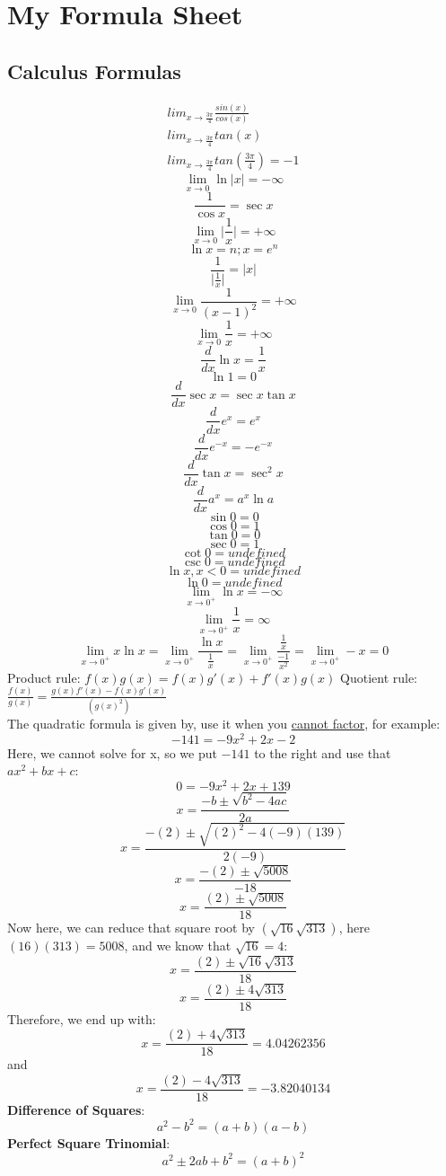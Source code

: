 \documentclass{article}
\begin{document}
\section*{My Formula Sheet}

\subsection*{Calculus Formulas}
\begin{align}
   lim_{x \to \frac{3\pi}{4}} \frac{sin(x)}{cos(x)}\\
   lim_{x \to \frac{3\pi}{4}} tan(x)\\
   lim_{x \to \frac{3\pi}{4}} tan(\frac{3\pi}{4}) = -1
\end{align}
\[\lim_{x \to 0} \ln{ \lvert x \rvert} = -\infty \]
\[\frac{1}{\cos{x}} = \sec{x}\]
\[\lim_{x \to 0} \lvert \frac{1}{x} \rvert = +\infty \] 
\[\ln{x}=n; x = e^{n}\]
\[\frac{1}{\lvert \frac{1}{x} \rvert} = \lvert x \rvert\]
\[\lim_{x \to 0}\frac{1}{(x-1)^2}=+\infty\]
\[\lim_{x \to 0}\frac{1}{x}=+\infty\]
\[\frac{d}{dx} \ln{x} = \frac{1}{x}\]
\[\ln{1} = 0\]
\[\frac{d}{dx} \sec{x} = \sec{x} \tan{x}\]
\[\frac{d}{dx} e^x = e^x\]
\[\frac{d}{dx} e^{-x} = -e^{-x}\]
\[\frac{d}{dx} \tan{x} = \sec^2{x}\]
\[\frac{d}{dx} a^x = a^x \ln{a}\]
\[\sin{0} = 0\]
\[\cos{0} = 1\]
\[\tan{0} = 0\]
\[\sec{0} = 1\]
\[\cot{0} = undefined\]
\[\csc{0} = undefined\]
\[\ln{x}, x<0 = undefined\]
\[\ln{0} = undefined\]
\[\lim_{x \to 0^+} \ln{x} = -\infty\]
\[\lim_{x \to 0^+} \frac{1}{x} = \infty\]
\[\lim_{x \to 0^+} x \ln{x} = \lim_{x \to 0^+} \frac{\ln{x}}{\frac{1}{x}} = \lim_{x \to 0^+} \frac{\frac{1}{x}}{\frac{-1}{x^2}} = \lim_{x \to 0^+} -x = 0\]
Product rule: \(f(x)g(x) = f(x)g'(x)+f'(x)g(x)\)
Quotient rule: \(\frac{f(x)}{g(x)} = \frac{g(x)f'(x)-f(x)g'(x)}{(g(x)^2)}\)\\
\newline
The quadratic formula is given by, use it when you \underline{cannot factor}, for example:
\[-141 = -9x^2+2x-2\]
Here, we cannot solve for x, so we put \(-141\) to the right and use that \(ax^2+bx+c\):
\[0 = -9x^2+2x+139\]
\[ x = \frac{-b \pm \sqrt{b^2 - 4ac}}{2a} \]
\[ x = \frac{-(2) \pm \sqrt{(2)^2 - 4(-9)(139)}}{2(-9)} \]
\[ x = \frac{-(2) \pm \sqrt{5008}}{-18} \]
\[ x = \frac{(2) \pm \sqrt{5008}}{18} \]
Now here, we can reduce that square root by \((\sqrt{16} \sqrt{313})\), here \((16)(313) = 5008\), and we know that \(\sqrt{16} = 4\):
\[ x = \frac{(2) \pm \sqrt{16} \sqrt{313}}{18} \]
\[ x = \frac{(2) \pm 4 \sqrt{313}}{18} \]
Therefore, we end up with:
\[ x = \frac{(2) + 4 \sqrt{313}}{18} = 4.04262356\]
and
\[ x = \frac{(2) - 4 \sqrt{313}}{18} = -3.82040134\]
\textbf{Difference of Squares}:
\[a^2-b^2 = (a+b)(a-b)\]
\textbf{Perfect Square Trinomial}: 
\[a^2 \pm 2ab + b^2 = (a+b)^2\]
\end{document}
